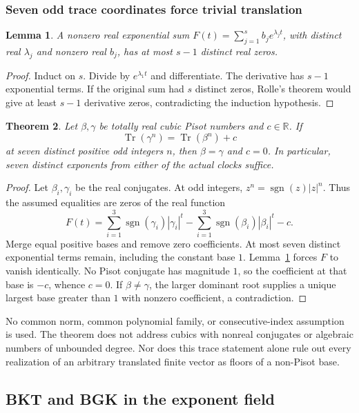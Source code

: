 \documentclass[11pt,a4paper]{article}
\newtheorem{theorem}{Theorem}[section]
\newtheorem{lemma}[theorem]{Lemma}\newtheorem{proposition}[theorem]{Proposition}
\theoremstyle{definition}\newtheorem{definition}[theorem]{Definition}
\theoremstyle{remark}\newtheorem{remark}[theorem]{Remark}
\newcommand{\R}{\mathbb R}\newcommand{\C}{\mathbb C}\newcommand{\F}{\mathbb F}
\DeclareMathOperator{\Tr}{Tr}\DeclareMathOperator{\tr}{tr}\DeclareMathOperator{\Nm}{N}
\begin{document}
\subsubsection{Seven odd trace coordinates force trivial translation}

\begin{lemma}\label{R18:lem:zeros}
A nonzero real exponential sum
$F(t)=\sum_{j=1}^s b_j e^{\lambda_jt}$, with distinct real
$\lambda_j$ and nonzero real $b_j$, has at most $s-1$ distinct real zeros.
\end{lemma}
\begin{proof}
Induct on $s$. Divide by $e^{\lambda_1t}$ and differentiate. The
derivative has $s-1$ exponential terms. If the original sum had $s$
distinct zeros, Rolle's theorem would give at least $s-1$ derivative
zeros, contradicting the induction hypothesis.
\end{proof}

\begin{theorem}\label{R18:thm:rigidity}
Let $\beta,\gamma$ be totally real cubic Pisot numbers and $c\in\R$.
If
\[
 \Tr(\gamma^n)=\Tr(\beta^n)+c
\]
at seven distinct positive odd integers $n$, then $\beta=\gamma$ and
$c=0$. In particular, seven distinct exponents from either of the
actual clocks suffice.
\end{theorem}
\begin{proof}
Let $\beta_i,\gamma_i$ be the real conjugates. At odd integers,
$z^n=\operatorname{sgn}(z)|z|^n$. Thus the assumed equalities are
zeros of the real function
\[
 F(t)=\sum_{i=1}^3\operatorname{sgn}(\gamma_i)|\gamma_i|^t
      -\sum_{i=1}^3\operatorname{sgn}(\beta_i)|\beta_i|^t-c.
\]
Merge equal positive bases and remove zero coefficients. At most seven
distinct exponential terms remain, including the constant base $1$.
Lemma~\ref{R18:lem:zeros} forces $F$ to vanish identically. No Pisot
conjugate has magnitude $1$, so the coefficient at that base is $-c$,
whence $c=0$. If $\beta\ne\gamma$, the larger dominant root supplies
a unique largest base greater than $1$ with nonzero coefficient, a
contradiction.
\end{proof}

No common norm, common polynomial family, or consecutive-index
assumption is used. The theorem does not address cubics with nonreal
conjugates or algebraic numbers of unbounded degree. Nor does this
trace statement alone rule out every realization of an arbitrary
translated finite vector as floors of a non-Pisot base.

\subsection{BKT and BGK in the exponent field}\label{R18:sec:bkt}
\end{document}
